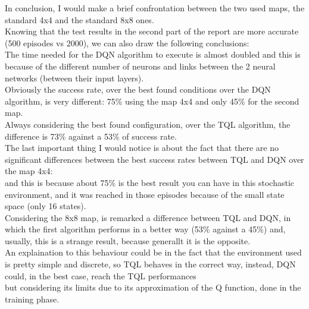 \documentclass{article}
\begin{document}
In conclusion, I would make a brief confrontation between the two used maps, the standard 4x4 and the standard 8x8 ones.
\\
Knowing that the test results in the second part of the report are more accurate (500 episodes vs 2000), we can also draw the following conclusions:
\\
The time needed for the DQN algorithm to execute is almost doubled and this is because of the different number of neurons and links between the 2 neural networks (between their input layers).
\\
Obviously the success rate, over the best found conditions over the DQN algorithm, is very different: 75\% using the map 4x4 and only 45\% for the second map.
\\
Always considering the best found configuration, over the TQL algorithm, the difference is 73\% against a 53\% of success rate.
\\
The last important thing I would notice is about the fact that there are no significant differences between the best success rates between TQL and DQN over the map 4x4: 
\\
and this is because about 75\% is the best result you can have in this stochastic environment, and it was reached in those episodes because of the small state space (only 16 states).
\\
Considering the 8x8 map, is remarked a difference between TQL and DQN, in which the first algorithm performs in a better way (53\% against a 45\%) and, usually, this is a strange result, because generallt it is the opposite.
\\
An explaination to this behaviour could be in the fact that the environment used is pretty simple and discrete, so TQL behaves in the correct way, instead, DQN could, in the best case, reach the TQL performances
\\
but considering its limits due to its approximation of the Q function, done in the training phase.
\end{document}
